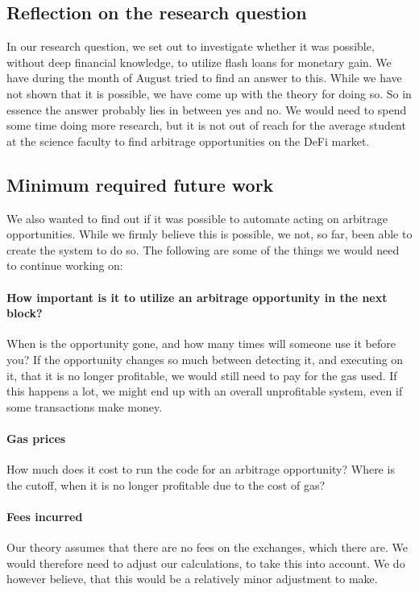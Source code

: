 \subsection{Reflection on the research question}
In our research question, we set out to investigate whether it was possible,
without deep financial knowledge, to utilize flash loans for monetary gain. We
have during the month of August tried to find an answer to this. While we have
not shown that it is possible, we have come up with the theory for doing so. So
in essence the answer probably lies in between yes and no. We would need to
spend some time doing more research, but it is not out of reach for the average
student at the science faculty to find arbitrage opportunities on the DeFi
market.

\subsection{Minimum required future work}
\noindent We also wanted to find out if it was possible to automate acting on
arbitrage opportunities. While we firmly believe this is possible, we not, so
far, been able to create the system to do so. The following are some of the
things we would need to continue working on: 

\paragraph{How important is it to utilize an arbitrage opportunity in the next
block?} When is the opportunity gone, and how many times will someone use it
before you? If the opportunity changes so much between detecting it, and
executing on it, that it is no longer profitable, we would still need to pay for
the gas used. If this happens a lot, we might end up with an overall
unprofitable system, even if some transactions make money.
\paragraph{Gas prices} How much does it cost to run the code for an arbitrage
opportunity? Where is the cutoff, when it is no longer profitable due to the
cost of gas?
\paragraph{Fees incurred} Our theory assumes that there are no fees on the
exchanges, which there are. We would therefore need to adjust our calculations,
to take this into account. We do however believe, that this would be a
relatively minor adjustment to make.
